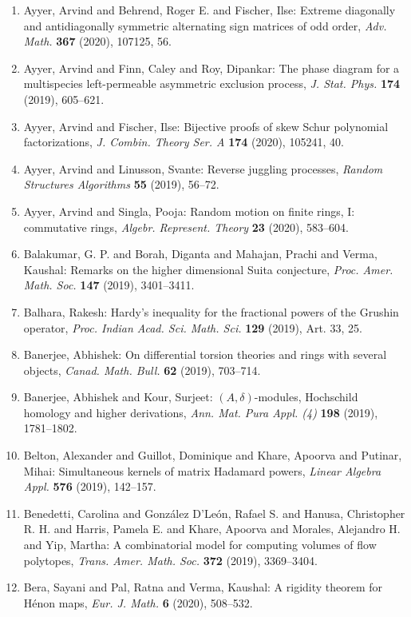 \begin{enumerate}
\item Ayyer, Arvind and Behrend, Roger E. and Fischer, Ilse: Extreme diagonally and antidiagonally symmetric alternating
sign matrices of odd order, \emph{Adv. Math.} {\bf 367} (2020), 107125, 56.
\item Ayyer, Arvind and Finn, Caley and Roy, Dipankar: The phase diagram for a multispecies left-permeable asymmetric
exclusion process, \emph{J. Stat. Phys.} {\bf 174} (2019), 605--621.
\item Ayyer, Arvind and Fischer, Ilse: Bijective proofs of skew {S}chur polynomial factorizations, \emph{J. Combin. Theory Ser. A} {\bf 174} (2020), 105241, 40.
\item Ayyer, Arvind and Linusson, Svante: Reverse juggling processes, \emph{Random Structures Algorithms} {\bf 55} (2019), 56--72.
\item Ayyer, Arvind and Singla, Pooja: Random motion on finite rings, {I}: commutative rings, \emph{Algebr. Represent. Theory} {\bf 23} (2020), 583--604.
\item Balakumar, G. P. and Borah, Diganta and Mahajan, Prachi and
Verma, Kaushal: Remarks on the higher dimensional {S}uita conjecture, \emph{Proc. Amer. Math. Soc.} {\bf 147} (2019), 3401--3411.
\item Balhara, Rakesh: Hardy's inequality for the fractional powers of the {G}rushin
operator, \emph{Proc. Indian Acad. Sci. Math. Sci.} {\bf 129} (2019), Art. 33, 25.
\item Banerjee, Abhishek: On differential torsion theories and rings with several
objects, \emph{Canad. Math. Bull.} {\bf 62} (2019), 703--714.
\item Banerjee, Abhishek and Kour, Surjeet: {$(A,\delta)$}-modules, {H}ochschild homology and higher
derivations, \emph{Ann. Mat. Pura Appl. (4)} {\bf 198} (2019), 1781--1802.
\item Belton, Alexander and Guillot, Dominique and Khare, Apoorva
and Putinar, Mihai: Simultaneous kernels of matrix {H}adamard powers, \emph{Linear Algebra Appl.} {\bf 576} (2019), 142--157.
\item Benedetti, Carolina and Gonz\'{a}lez D'Le\'{o}n, Rafael S. and Hanusa,
Christopher R. H. and Harris, Pamela E. and Khare, Apoorva and
Morales, Alejandro H. and Yip, Martha: A combinatorial model for computing volumes of flow polytopes, \emph{Trans. Amer. Math. Soc.} {\bf 372} (2019), 3369--3404.
\item Bera, Sayani and Pal, Ratna and Verma, Kaushal: A rigidity theorem for {H}\'{e}non maps, \emph{Eur. J. Math.} {\bf 6} (2020), 508--532.

\end{enumerate}
